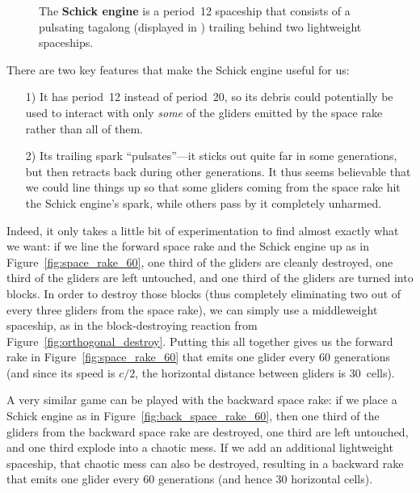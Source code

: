 \begin{figure}[!htb]
	\centering{}
	\caption{The \textbf{Schick engine} is a period~12 spaceship that consists of a pulsating tagalong (displayed in ) trailing behind two lightweight spaceships.}\label{fig:schick_engine}
\end{figure}

There are two key features that make the Schick engine useful for us:\smallskip

\begin{enumerate}
	\item[1)] It has period~12 instead of period~20, so its debris could potentially be used to interact with only \emph{some} of the gliders emitted by the space rake rather than all of them.\smallskip
	
	\item[2)] Its trailing spark ``pulsates''---it sticks out quite far in some generations, but then retracts back during other generations. It thus seems believable that we could line things up so that some gliders coming from the space rake hit the Schick engine's spark, while others pass by it completely unharmed.\smallskip
\end{enumerate}

Indeed, it only takes a little bit of experimentation to find almost exactly what we want: if we line the forward space rake and the Schick engine up as in Figure~\ref{fig:space_rake_60}, one third of the gliders are cleanly destroyed, one third of the gliders are left untouched, and one third of the gliders are turned into blocks. In order to destroy those blocks (thus completely eliminating two out of every three gliders from the space rake), we can simply use a middleweight spaceship, as in the block-destroying reaction from Figure~\ref{fig:orthogonal_destroy}. Putting this all together gives us the forward rake in Figure~\ref{fig:space_rake_60} that emits one glider every 60 generations (and since its speed is $c/2$, the horizontal distance between gliders is 30~cells).

A very similar game can be played with the backward space rake: if we place a Schick engine as in Figure~\ref{fig:back_space_rake_60}, then one third of the gliders from the backward space rake are destroyed, one third are left untouched, and one third explode into a chaotic mess. If we add an additional lightweight spaceship, that chaotic mess can also be destroyed, resulting in a backward rake that emits one glider every 60 generations (and hence 30 horizontal cells).

